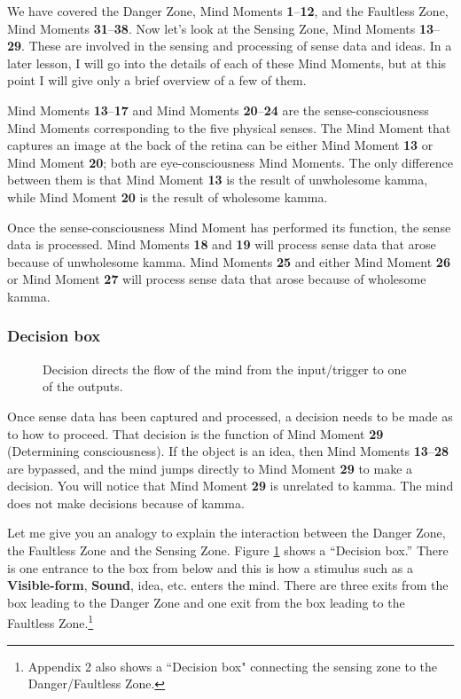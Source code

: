 We have covered the Danger Zone, Mind Moments \textbf{1}--\textbf{12}, and the Faultless Zone, Mind Moments \textbf{31}--\textbf{38}. Now let’s look at the Sensing Zone, Mind Moments \textbf{13}--\textbf{29}. These are involved in the sensing and processing of sense data and ideas. In a later lesson, I will go into the details of each of these Mind Moments, but at this point I will give only a brief overview of a few of them.

Mind Moments \textbf{13}--\textbf{17} and Mind Moments \textbf{20}--\textbf{24} are the sense-consciousness Mind Moments corresponding to the five physical senses. The Mind Moment that captures an image at the back of the retina can be either Mind Moment \textbf{13} or Mind Moment \textbf{20}; both are eye-consciousness Mind Moments. The only difference between them is that Mind Moment \textbf{13} is the result of unwholesome kamma, while Mind Moment \textbf{20} is the result of wholesome kamma.

Once the sense-consciousness Mind Moment has performed its function, the sense data is processed. Mind Moments \textbf{18} and \textbf{19} will process sense data that arose because of unwholesome kamma. Mind Moments \textbf{25} and either Mind Moment \textbf{26} or Mind Moment \textbf{27} will process sense data that arose because of wholesome kamma.

\pagebreak
\subsubsection*{Decision box}

\begin{figure}[H]
\centering

\caption{Decision directs the flow of the mind from the input/trigger to one of the outputs.}
\label{fig:Room}
\end{figure}

Once sense data has been captured and processed, a decision needs to be made as to how to proceed. That decision is the function of Mind Moment \textbf{29} (Determining consciousness). If the object is an idea, then Mind Moments \textbf{13}--\textbf{28} are bypassed, and the mind jumps directly to Mind Moment \textbf{29} to make a decision. You will notice that Mind Moment \textbf{29} is unrelated to kamma. The mind does not make decisions because of kamma.

Let me give you an analogy to explain the interaction between the Danger Zone, the Faultless Zone and the Sensing Zone. Figure \ref{fig:Room} shows a “Decision box.” There is one entrance to the box from below and this is how a stimulus such as a \textbf{Visible-form}, \textbf{Sound}, idea, etc. enters the mind. There are three exits from the box leading to the Danger Zone and one exit from the box leading to the Faultless Zone.\footnote{Appendix 2 also shows a ``Decision box" connecting the sensing zone to the Danger/Faultless Zone.}

